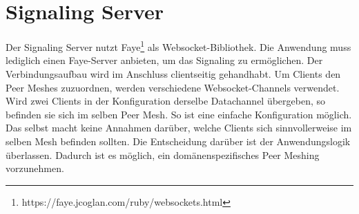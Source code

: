 \section{Signaling Server}\label{i:signaling}
Der Signaling Server nutzt Faye\footnote{https://faye.jcoglan.com/ruby/websockets.html} als Websocket-Bibliothek. Die Anwendung muss lediglich einen Faye-Server anbieten, um das Signaling zu ermöglichen. Der Verbindungsaufbau wird im Anschluss clientseitig gehandhabt. 
Um Clients den Peer Meshes zuzuordnen, werden verschiedene Websocket-Channels verwendet. Wird zwei Clients in der Konfiguration derselbe Datachannel übergeben, so befinden sie sich im selben Peer Mesh. So ist eine einfache Konfiguration möglich. Das \cdn selbst macht keine Annahmen darüber, welche Clients sich sinnvollerweise im selben Mesh befinden sollten. Die Entscheidung darüber ist der Anwendungslogik überlassen. Dadurch ist es möglich, ein domänenspezifisches Peer Meshing vorzunehmen.


